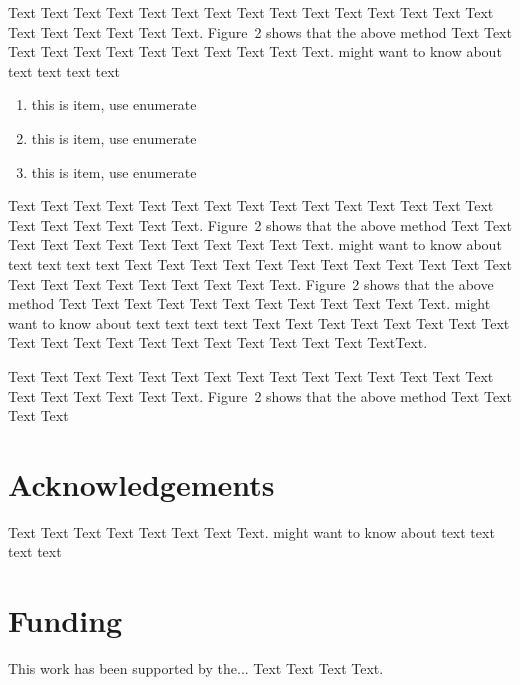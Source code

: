 \documentclass{bioinfo}
\begin{document}
Text Text Text Text Text Text  Text Text Text Text Text Text Text
Text Text  Text Text Text Text Text Text.
Figure~2\vphantom{\ref{fig:02}} shows that the above method  Text
Text Text Text  Text Text Text Text Text Text  Text Text.
\citealp{Boffelli03} might want to know about  text text text text

\begin{enumerate}
\item this is item, use enumerate
\item this is item, use enumerate
\item this is item, use enumerate
\end{enumerate}

Text Text Text Text Text Text Text Text Text Text Text Text Text
Text Text Text Text Text Text Text Text.
Figure~2\vphantom{\ref{fig:02}} shows\vadjust{\pagebreak} that the
above method  Text Text Text Text Text Text Text Text Text Text
Text Text.  \citealp{Boffelli03} might want to know about text
text text text Text Text Text Text Text Text  Text Text Text Text
Text Text Text Text Text Text Text Text Text Text Text.
Figure~2\vphantom{\ref{fig:02}} shows that the above method  Text
Text Text Text Text Text Text Text Text Text  Text Text.
\citealp{Boffelli03} might want to know about text text text text
Text Text Text Text Text Text  Text Text Text Text Text Text Text
Text Text Text Text Text Text Text\break Text.


Text Text Text Text Text Text  Text Text Text Text Text Text Text
Text Text  Text Text Text Text Text Text.
Figure~2\vphantom{\ref{fig:02}} shows that the above method  Text
Text Text Text\vspace*{-10pt}


\section*{Acknowledgements}

Text Text Text Text Text Text  Text Text.  \citealp{Boffelli03} might want to know about  text
text text text\vspace*{-12pt}

\section*{Funding}

This work has been supported by the... Text Text  Text Text.\vspace*{-12pt}

%
%
%
%
%
%
%
%
%
\end{document}

